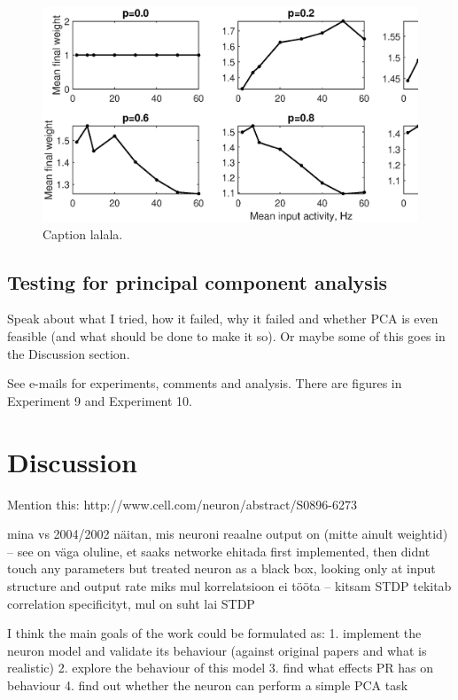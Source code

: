 \documentclass[a4paper,12pt]{report}
\theoremstyle{definition}
\begin{document}
\begin{figure}[h]
    \includegraphics[width=\textwidth]{figures/exp8_gridweights_epsp05.eps}
    \caption{Caption lalala.}
    \label{fig:exp8gridweights}
\end{figure}


\section{Testing for principal component analysis} %
Speak about what I tried, how it failed, why it failed and whether PCA is even feasible (and what should be done to make it so). Or maybe some of this goes in the Discussion section.

See e-mails for experiments, comments and analysis. There are figures in Experiment 9 and Experiment 10.


\chapter{Discussion}
Mention this: http://www.cell.com/neuron/abstract/S0896-6273%

mina vs 2004/2002
näitan, mis neuroni reaalne output on (mitte ainult weightid) -- see on väga oluline, et saaks networke ehitada
first implemented, then didnt touch any parameters but treated neuron as a black box, looking only at input structure and output rate
miks mul korrelatsioon ei tööta -- kitsam STDP tekitab correlation specificityt, mul on suht lai STDP

I think the main goals of the work could be formulated as:
1. implement the neuron model and validate its behaviour (against original papers and what is realistic)
2. explore the behaviour of this model
3. find what effects PR has on behaviour
4. find out whether the neuron can perform a simple PCA task
\end{document}
